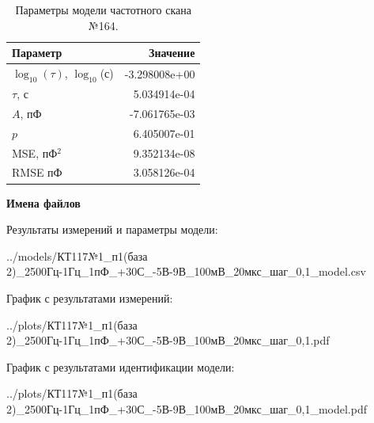 \begin{table}[!ht]
    \centering
    \caption{Параметры модели частотного скана №164.}
    \begin{tabular}{|l|r|}
        \hline
        Параметр                                       & Значение                  \\ \hline
        $\log_{10}(\tau)$, $\log_{10}$(с)              & -3.298008e+00             \\ \hline
        $\tau$, с                                      & 5.034914e-04              \\ \hline
        $A$, пФ                                        & -7.061765e-03             \\ \hline
        $p$                                            & 6.405007e-01              \\ \hline
        MSE, пФ$^2$                                    & 9.352134e-08              \\ \hline
        RMSE пФ                                        & 3.058126e-04              \\ \hline
    \end{tabular}
    \label{table:frequency_scan_model_164}
\end{table}

\textbf{Имена файлов}

Результаты измерений и параметры модели:

\scriptsize../models/КТ117№1\_п1(база 2)\_2500Гц-1Гц\_1пФ\_+30С\_-5В-9В\_100мВ\_20мкс\_шаг\_0,1\_model.csv
\normalsize

График с результатами измерений:

\scriptsize../plots/КТ117№1\_п1(база 2)\_2500Гц-1Гц\_1пФ\_+30С\_-5В-9В\_100мВ\_20мкс\_шаг\_0,1.pdf
\normalsize

График с результатами идентификации модели:

\scriptsize../plots/КТ117№1\_п1(база 2)\_2500Гц-1Гц\_1пФ\_+30С\_-5В-9В\_100мВ\_20мкс\_шаг\_0,1\_model.pdf
\normalsize

